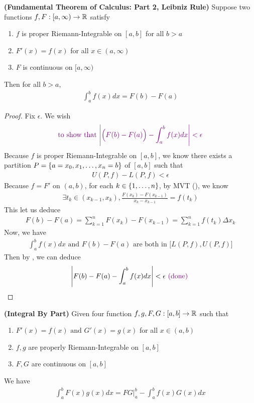 \documentclass{report}
\begin{document}
\begin{theorem}
\label{FTC2}
\textbf{(Fundamental Theorem of Calculus: Part 2, Leibniz Rule)} Suppose two functions $f,F:[a,\infty )\rightarrow \mathbb{R}$ satisfy 
\begin{enumerate}[label=(\alph*)]
  \item $f$ is proper Riemann-Integrable on $[a,b]$ for all $b>a$ 
\item $F'(x)=f(x)$ for all $x \in (a, \infty)$ 
\item $F$ is continuous on  $[a,\infty)$
\end{enumerate}
Then for all $b>a$, 
\begin{align*}
\int_a^b f(x)dx=F(b)-F(a)
\end{align*}
\end{theorem}
\begin{proof}
Fix $\epsilon $. We wish 
\begin{align*}
\textcolor{violet}{\text{ to show that $\left|\Big( F(b)-F(a)\Big)-\int_a^b f(x)dx\right|<\epsilon $ }}
\end{align*}
Because $f$ is proper Riemann-Integrable on $[a,b]$, we know there exists a partition $P=\{ a=x_0,x_1,\dots , x_n=b \}$ of  $[a,b]$ such that 
\begin{align}
\label{FP}
U(P,f)-L(P,f)<\epsilon 
\end{align}
Because $f=F'$ on  $(a,b)$, for each $k \in \{ 1,\dots ,n \}$, by MVT (), we know 
\begin{align*}
\exists t_k \in (x_{k-1},x_k), \frac{F(x_k)-F(x_{k-1})}{x_k-x_{k-1}}=f(t_k)
\end{align*}
This let us deduce
\begin{align*}
F(b)-F(a)=\sum_{k=1}^n F(x_k)-F(x_{k-1})=\sum_{k=1}^n f(t_k) \Delta x_k
\end{align*}
Now, we have 
\begin{align*}
  \int_a^b f(x)dx\text{ and }F(b)-F(a)\text{ are both in }\big[ L(P,f),U(P,f) \big]
\end{align*}
Then by , we can deduce 
\begin{align*}
\left|F(b)-F(a)- \int_a^b f(x)dx\right|<\epsilon \textcolor{violet}{\text{ (done) }}
\end{align*}




\end{proof}
\begin{theorem}
\textbf{(Integral By Part)} Given four function $f,g,F,G:[a,b]\rightarrow \mathbb{R}$ such that 

\begin{enumerate}[label=(\alph*)]
  \item $F'(x)=f(x)\text{ and }G'(x)=g(x)$ for all $x\in (a,b)$ 
  \item $f,g$ are properly Riemann-Integrable on  $[a,b]$ 
  \item $F,G$ are continuous on  $[a,b]$
\end{enumerate}
We have
\begin{align}
\label{FI}
\int_a^b F(x)g(x)dx=FG\Big|^b_a-\int_a^b f(x)G(x)dx
\end{align}
\end{theorem}
\end{document}
